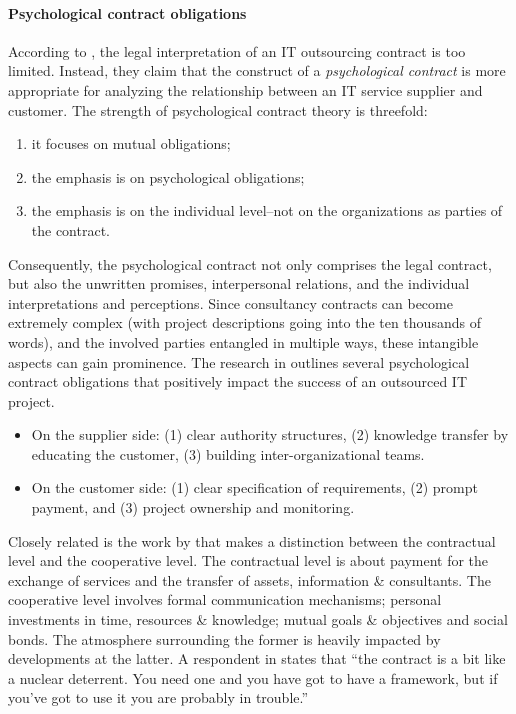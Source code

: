 \documentclass[12pt]{article}
\providecommand{\tightlist}{%
  \setlength{\itemsep}{0pt}\setlength{\parskip}{0pt}}
\begin{document}
\hypertarget{psychological-contract-obligations}{%
\paragraph{Psychological contract
obligations}\label{psychological-contract-obligations}}

According to \citet[357]{ang2004}, the legal interpretation of an IT
outsourcing contract is too limited. Instead, they claim that the
construct of a \emph{psychological contract} is more appropriate for
analyzing the relationship between an IT service supplier and customer.
The strength of psychological contract theory is threefold:

\begin{enumerate}
\def\labelenumi{\arabic{enumi}.}
\tightlist
\item
  it focuses on mutual obligations;
\item
  the emphasis is on psychological obligations;
\item
  the emphasis is on the individual level--not on the organizations as
  parties of the contract.
\end{enumerate}

Consequently, the psychological contract not only comprises the legal
contract, but also the unwritten promises, interpersonal relations, and
the individual interpretations and perceptions. Since consultancy
contracts can become extremely complex (with project descriptions going
into the ten thousands of words), and the involved parties entangled in
multiple ways, these intangible aspects can gain prominence. The
research in \citet[369-70]{ang2004} outlines several psychological
contract obligations that positively impact the success of an outsourced
IT project.

\begin{itemize}
\tightlist
\item
  On the supplier side: (1) clear authority structures, (2) knowledge
  transfer by educating the customer, (3) building inter-organizational
  teams.
\item
  On the customer side: (1) clear specification of requirements, (2)
  prompt payment, and (3) project ownership and monitoring.
\end{itemize}

Closely related is the work by \citet[9-13]{willcockskern} that makes a
distinction between the contractual level and the cooperative level. The
contractual level is about payment for the exchange of services and the
transfer of assets, information \& consultants. The cooperative level
involves formal communication mechanisms; personal investments in time,
resources \& knowledge; mutual goals \& objectives and social bonds. The
atmosphere surrounding the former is heavily impacted by developments at
the latter. A respondent in \citet[9]{willcockskern} states that ``the
contract is a bit like a nuclear deterrent. You need one and you have
got to have a framework, but if you've got to use it you are probably in
trouble.''
\end{document}
